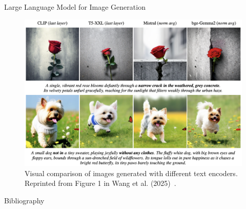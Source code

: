 \documentclass[12pt]{beamer}
\begin{document}
\begin{frame}[allowframebreaks]{Large Language Model for Image Generation}
    \begin{figure}
        \centering
        \includegraphics[width=0.9\linewidth, height=0.5\textheight]{figures/image_generation.png}
        \caption{Visual comparison of images generated with different text encoders. Reprinted from Figure 1 in Wang et al. (2025)~\cite{11094992}.}
        \label{fig:Fig. 11}
    \end{figure}
\end{frame}


\begin{frame}[allowframebreaks]{Bibliography}

\scriptsize


\end{frame}
\end{document}
